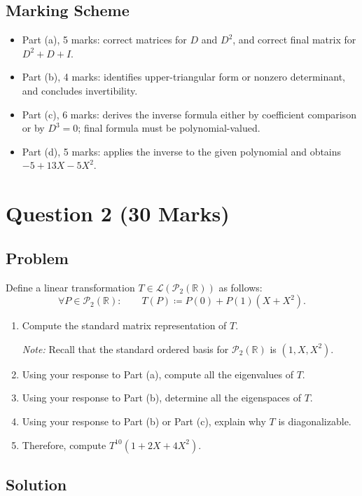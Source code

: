 \documentclass[12pt]{article}
\newcommand{\R}{\mathbb{R}}
\newcommand{\cP}{\mathcal{P}}
\newcommand{\cL}{\mathcal{L}}
\newcommand{\df}{\coloneqq}
\begin{document}
\newpage
\subsection{Marking Scheme}
\begin{itemize}[leftmargin=*]
  \item Part (a), 5 marks: correct matrices for $D$ and $D^2$, and correct final matrix for $D^2+D+I$.
  \item Part (b), 4 marks: identifies upper-triangular form or nonzero determinant, and concludes invertibility.
  \item Part (c), 6 marks: derives the inverse formula either by coefficient comparison or by $D^3=0$; final formula must be polynomial-valued.
  \item Part (d), 5 marks: applies the inverse to the given polynomial and obtains $-5+13X-5X^2$.
\end{itemize}

\newpage
\section{Question 2 \hfill (30 Marks)}

\subsection{Problem}
Define a linear transformation $T\in\cL(\cP_2(\R))$ as follows:
\[
  \forall P\in\cP_2(\R):\qquad
  T(P)\df P(0)+P(1)(X+X^2).
\]
\begin{enumerate}[label=(\alph*)]
  \item Compute the standard matrix representation of $T$.

  \textit{Note:} Recall that the standard ordered basis for $\cP_2(\R)$ is $(1,X,X^2)$.
  \item Using your response to Part (a), compute all the eigenvalues of $T$.
  \item Using your response to Part (b), determine all the eigenspaces of $T$.
  \item Using your response to Part (b) or Part (c), explain why $T$ is diagonalizable.
  \item Therefore, compute $T^{10}(1+2X+4X^2)$.
\end{enumerate}

\newpage
\subsection{Solution}
\end{document}
